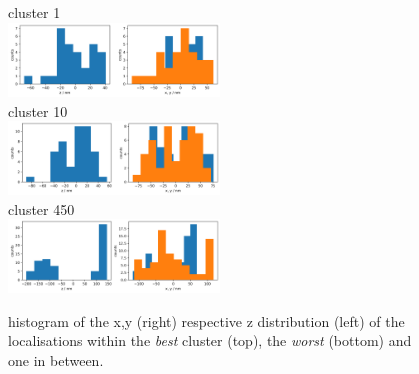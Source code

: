 \documentclass[11pt, a4paper, oneside, twocolumn]{report}
\newcommand{\e}{\emph}
\begin{document}





\begin{figure}[h!]
  \centering
  cluster 1\\
  \includegraphics[width=0.5\textwidth]{10_histograms_1.png}\\
  cluster 10\\
  \includegraphics[width=0.5\textwidth]{10_histograms_10.png}\\
  cluster 450\\
  \includegraphics[width=0.5\textwidth]{10_histograms_450.png}
  \caption{histogram of the x,y (right) respective z distribution
    (left) of the localisations within the \e{best} cluster (top), the
    \e{worst} (bottom) and one in between.}
  \label{f:10_xyz_best_filtered_clusters}
\end{figure}
\end{document}
